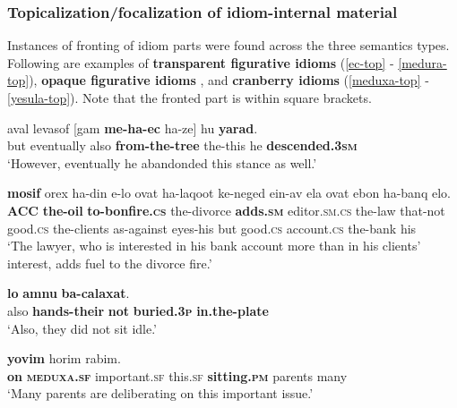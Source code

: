 \documentclass[output=paper]{langsci/langscibook}
\begin{document}
\subsubsection{Topicalization/focalization of idiom-internal material}
\label{sec:topicalization}
Instances of fronting of idiom parts were found across the three semantics types. Following are examples of \textbf{transparent figurative idioms} (\ref{ec-top} - \ref{medura-top}), \textbf{opaque figurative idioms} , and \textbf{cranberry idioms} (\ref{meduxa-top} - \ref{yesula-top}). Note that the fronted part is within square brackets.

	\ea\label{ec-top}
		\gll {\alef}aval levasof [gam \textbf{me-ha-{\ayin}ec} ha-ze] hu \textbf{yarad}.\\
		  but eventually also \textbf{from-the-tree} the-this he \textbf{descended.\textsc{3sm}}\\
		\glt `However, eventually he abandonded this stance as well.'
	\z
	
    \ea\label{medura-top}
         \textbf{mosif} {\ayin}orex ha-din {\shin}e-lo {\tet}ovat ha-laqo{\het}ot ke-neged {\ayin}ein-av {\alef}ela {\tet}ovat {\het}e{\shin}bon ha-banq {\shin}elo.\\
            \textbf{ACC} \textbf{the-oil} \textbf{to-bonfire.\textsc{cs}} the-divorce \textbf{adds.\textsc{sm}} editor.\textsc{sm}.\textsc{cs} the-law that-not good.\textsc{cs} the-clients as-against eyes-his but good.\textsc{cs} account.\textsc{cs} the-bank his\\
        \glt `The lawyer, who is interested in his bank account more than in his clients' interest, adds fuel to the divorce fire.'
    \z

	
	\ea\label{taman-top}
		 \textbf{lo} \textbf{{\tet}amnu} \textbf{ba-calaxat}.\\
		also \textbf{hands-their} \textbf{not} \textbf{buried.\textsc{3p}} \textbf{in.the-plate}\\
		\glt `Also, they did not sit idle.'
	\z
	
    \ea\label{meduxa-top}
         \textbf{yo{\shin}vim} horim rabim.\\
                  \textbf{on} \textbf{\textsc{meduxa}.\textsc{sf}} important.\textsc{sf} this.\textsc{sf} \textbf{sitting.\textsc{pm}} parents many\\
        \glt `Many parents are deliberating on this important issue.'
    \z
\end{document}
